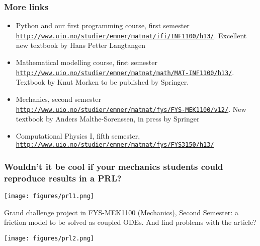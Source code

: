 \documentclass{beamer}
\begin{document}
\begin{frame}
\frametitle{More links}

\begin{block}{}
\begin{itemize}
\item Python and our first programming course, first semester \href{{http://www.uio.no/studier/emner/matnat/ifi/INF1100/h13/}}{\nolinkurl{http://www.uio.no/studier/emner/matnat/ifi/INF1100/h13/}}. Excellent new textbook by Hans Petter Langtangen

\item Mathematical modelling course, first semester \href{{http://www.uio.no/studier/emner/matnat/math/MAT-INF1100/h13/}}{\nolinkurl{http://www.uio.no/studier/emner/matnat/math/MAT-INF1100/h13/}}. Textbook by Knut Morken to be published by Springer.

\item Mechanics, second semester \href{{http://www.uio.no/studier/emner/matnat/fys/FYS-MEK1100/v12/}}{\nolinkurl{http://www.uio.no/studier/emner/matnat/fys/FYS-MEK1100/v12/}}. New textbook by Anders Malthe-Sorenssen, in press by Springer

\item Computational Physics I, fifth semester, \href{{http://www.uio.no/studier/emner/matnat/fys/FYS3150/h13/}}{\nolinkurl{http://www.uio.no/studier/emner/matnat/fys/FYS3150/h13/}}
\end{itemize}

\noindent
\end{block}
\end{frame}

\begin{frame}
\frametitle{Wouldn't it be cool if your mechanics students could reproduce results in a PRL?}

\begin{block}{}


\centerline{\texttt{[image: figures/prl1.png]}}



Grand challenge project in FYS-MEK1100 (Mechanics), Second Semester: a friction model to be solved as coupled ODEs. And find problems with the article?
\end{block}
\begin{block}{}


\centerline{\texttt{[image: figures/prl2.png]}}


\end{block}
\end{frame}
\end{document}
